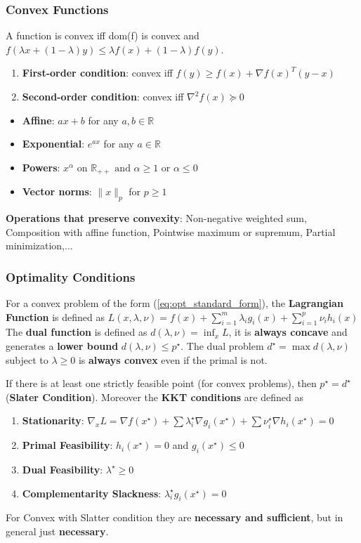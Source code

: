 \subsubsection{Convex Functions}
A function is convex iff dom(f) is convex and $f(\lambda x + (1-\lambda)y) \leq \lambda f(x) + (1-\lambda)f(y)$.
\begin{enumerate}
    \item \textbf{First-order condition}: convex iff $f(y) \geq f(x) + \nabla f(x)^T(y-x)$
    \item \textbf{Second-order condition}: convex iff $\nabla^2f(x) \succeq 0$
\end{enumerate}
\begin{itemize}
    \item \textbf{Affine}: $ax + b$ for any $a,b \in \mathbb{R}$
    \item \textbf{Exponential}: $e^{ax}$ for any $a \in \mathbb{R}$
    \item \textbf{Powers}: $x^\alpha$ on $\mathbb{R}_{++} \text{ and } \alpha \geq 1 \text{ or } \alpha \leq 0$
    \item \textbf{Vector norms}: $\|x\|_p$ for $p \geq 1$
\end{itemize}

\textbf{Operations that preserve convexity}: Non-negative weighted sum, Composition with affine function, Pointwise maximum or supremum, Partial minimization,...

\subsubsection{Optimality Conditions}
For a convex problem of the form (\ref{eq:opt_standard_form}), the \textbf{Lagrangian Function} is defined as $L(x, \lambda, \nu) = f(x) + \sum_{i =1}^m \lambda_i g_i(x) + \sum_{i =1}^p \nu_i h_i(x)$ The \textbf{dual function} is defined as $d(\lambda,\nu) = \inf_x L$, it is  \textbf{always concave} and generates a \textbf{lower bound} $d(\lambda, \nu) \leq p^\star$. The dual problem $ d^\star = \max d(\lambda, \nu)$ subject to $\lambda \geq 0$ is \textbf{always convex} even if the primal is not.\vspace{4pt}

If there is at least one strictly feasible point (for convex problems), then $p^\star = d^\star$ (\textbf{Slater Condition}). Moreover the \textbf{KKT conditions} are defined as
\begin{enumerate}
    \item \textbf{Stationarity}: $\nabla_x L = \nabla f(x^\star)+ \sum \lambda_i^\star \nabla g_i(x^\star) + \sum\nu_i^\star \nabla h_i(x^\star) = 0$
    \item \textbf{Primal Feasibility}: $h_i(x^\star) = 0$ and $g_i(x^\star) \leq 0$
    \item \textbf{Dual Feasibility}: $\lambda^\star \geq 0$
    \item \textbf{Complementarity Slackness}: $\lambda^\star_i g_i(x^\star)= 0$
\end{enumerate}
For Convex with Slatter condition they are \textbf{necessary and sufficient}, but in general just \textbf{necessary}.

